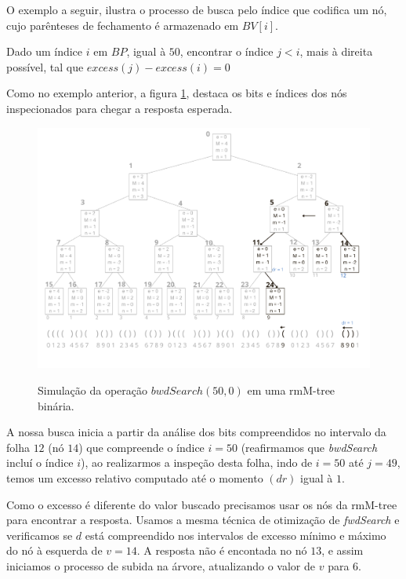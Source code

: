     O exemplo a seguir, ilustra o processo de busca pelo índice que codifica um nó, cujo parênteses de fechamento é armazenado em $BV[i]$.
    \begin{example}\label{ex:bin-bwd}
        Dado um índice $i$ em $BP$, igual à $50$, encontrar o índice $j<i$, mais à direita possível, tal que $excess(j) - excess(i) = 0$


        Como no exemplo anterior, a figura \ref{fig:bin-bwdSearch}, destaca os bits e índices dos nós inspecionados para chegar a resposta esperada.
        \begin{figure}[h!]
           \centering
             \caption[bwdSearch(50,0).]{Simulação da operação $bwdSearch(50,0)$ em uma rmM-tree binária.}
             \includegraphics[width=\columnwidth]{images/rmm-tree-bin-bwdsearch.png}
             \label{fig:bin-bwdSearch}
        \end{figure}

        A nossa busca inicia a partir da análise dos bits compreendidos no intervalo da folha $12$ (nó $14$) que compreende o índice $i=50$ (reafirmamos que \textit{bwdSearch} incluí o índice $i$), ao realizarmos a inspeção desta folha, indo de $i=50$ até $j=49$, temos um excesso relativo computado até o momento $(dr)$ igual à $1$. 
        
        Como o excesso é diferente do valor buscado precisamos usar os nós da rmM-tree para encontrar a resposta. Usamos a mesma técnica de otimização de \textit{fwdSearch} e verificamos se $d$ está compreendido nos intervalos de excesso mínimo e máximo do nó à esquerda de $v=14$. A resposta não é encontada no nó $13$, e assim iniciamos o processo de subida na árvore, atualizando o valor de $v$ para $6$.
        

\end{example}
